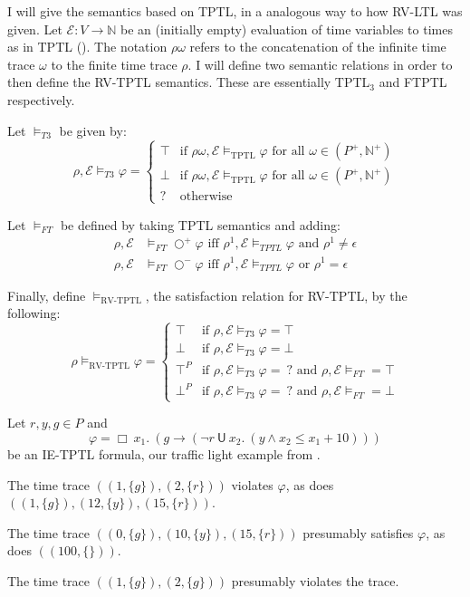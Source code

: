 \documentclass[a4paper]{article}
\newcommand{\U}{\mathsf{U}}
\newcommand{\tand}{\text{ and }}
\newcommand{\tor}{\text{ or }}
\newcommand{\tiff}{\text{ iff }}
\newcommand{\fall}{\text{ for all }}
\newcommand{\sn}{\bigcirc^+}
\newcommand{\wn}{\bigcirc^-}
\newcommand{\eval}{\mathcal{E}}
\begin{document}
\begin{defn}\label{rvtptlsem}

  I will give the semantics based on TPTL, in a analogous way to how RV-LTL was given.
  Let $\eval:V\to\mathbb{N}$ be an (initially empty) evaluation of time variables to times as in TPTL ().
  The notation $\rho\omega$ refers to the concatenation of the infinite time trace $\omega$ to the finite time trace $\rho$.
  I will define two semantic relations in order to then define the RV-TPTL semantics. These are essentially TPTL$_3$ and FTPTL respectively.

  Let $\vDash_{T3}$ be given by:
  \[\rho,\eval\vDash_{T3}\varphi = \begin{cases}
    \top & \text{if } \rho\omega,\eval \vDash_{\text{TPTL}} \varphi \fall \omega \in (P^+,\mathbb{N}^+)\\
    \bot & \text{if }  \rho\omega,\eval \vDash_{\text{TPTL}} \varphi \fall \omega \in (P^+,\mathbb{N}^+)\\
      ? & \text{otherwise}
    \end{cases}
  \]

  Let $\vDash_{FT}$ be defined by taking TPTL semantics and adding:
  \begin{align*}\label{ftsem}
    \rho,\eval&\vDash_{FT}\sn\varphi \tiff \rho^1,\eval\vDash_{TPTL}\varphi \tand \rho^1 \neq \epsilon\\
    \rho,\eval&\vDash_{FT}\wn\varphi \tiff \rho^1,\eval\vDash_{TPTL}\varphi \tor \rho^1 = \epsilon
  \end{align*}

  Finally, define $\vDash_{\text{RV-TPTL}}$, the satisfaction relation for RV-TPTL, by the following:
  \[\rho\vDash_{\text{RV-TPTL}}\varphi =
    \begin{cases}
      \top & \text{if } \rho,\eval\vDash_{T3} \varphi = \top\\
      \bot & \text{if } \rho,\eval \vDash_{T3} \varphi = \bot\\
      \top^P & \text{if } \rho,\eval \vDash_{T3} \varphi = ~?\tand \rho,\eval\vDash_{FT} = \top \\
      \bot^P & \text{if } \rho,\eval \vDash_{T3} \varphi = ~?\tand \rho,\eval\vDash_{FT} = \bot
    \end{cases}
  \]
\end{defn}

\begin{eg}
  Let $r,y,g\in P$ and \[\varphi = \Box ~x_1.~ (g \to (\neg r ~\U~ x_2.~ (y \land x_2 \leq x_1 + 10) ))\] be an IE-TPTL formula, our traffic light example from .

  The time trace $((1,\{g\}),(2,\{r\}))$ violates $\varphi$,
  as does $((1,\{g\}),(12,\{y\}),(15,\{r\}))$.

  The time trace $((0,\{g\}),(10,\{y\}),(15,\{r\}))$ presumably satisfies $\varphi$, as does $((100,\{\}))$.

  The time trace $((1,\{g\}),(2,\{g\}))$ presumably violates the trace.
\end{eg}
\end{document}
